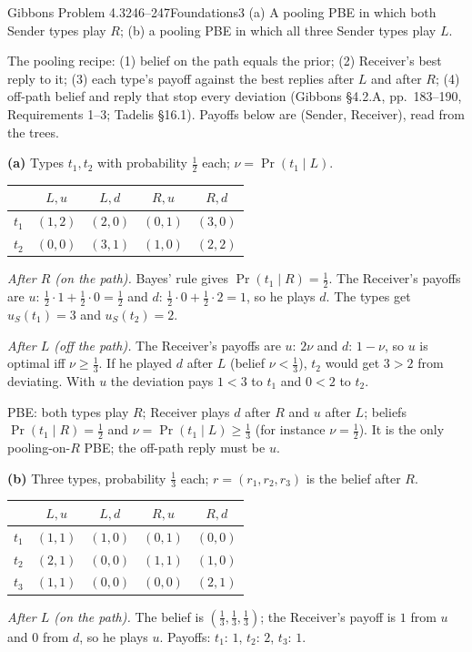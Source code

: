\begin{exsol}{Gibbons Problem 4.3}{246--247}{Foundations}{3}
\asked (a) A pooling PBE in which both Sender types play $R$; (b) a pooling PBE in which all three
Sender types play $L$.

\method The pooling recipe: (1) belief on the path equals the prior; (2) Receiver's best reply to
it; (3) each type's payoff against the best replies after $L$ and after $R$; (4) off-path belief
and reply that stop every deviation (Gibbons \S4.2.A, pp.~183--190, Requirements 1--3; Tadelis
\S16.1). Payoffs below are (Sender, Receiver), read from the trees.

\solution \textbf{(a)} Types $t_1, t_2$ with probability $\frac12$ each; $\nu = \Pr(t_1 \mid L)$.
\begin{center}
\begin{tabular}{lcccc}
\toprule
 & $L,u$ & $L,d$ & $R,u$ & $R,d$ \\
\midrule
$t_1$ & $(1,2)$ & $(2,0)$ & $(0,1)$ & $(3,0)$ \\
$t_2$ & $(0,0)$ & $(3,1)$ & $(1,0)$ & $(2,2)$ \\
\bottomrule
\end{tabular}
\end{center}
\emph{After $R$ (on the path).} Bayes' rule gives $\Pr(t_1 \mid R) = \frac12$. The Receiver's payoffs
are $u$: $\frac12 \cdot 1 + \frac12 \cdot 0 = \frac12$ and $d$: $\frac12 \cdot 0 + \frac12 \cdot 2 = 1$,
so he plays $d$. The types get $u_S(t_1) = 3$ and $u_S(t_2) = 2$.

\emph{After $L$ (off the path).} The Receiver's payoffs are $u$: $2\nu$ and $d$: $1 - \nu$, so
$u$ is optimal iff $\nu \ge \frac13$. If he played $d$ after $L$ (belief $\nu < \frac13$), $t_2$ would
get $3 > 2$ from deviating. With $u$ the deviation pays $1 < 3$ to $t_1$ and $0 < 2$ to $t_2$.

PBE: both types play $R$; Receiver plays $d$ after $R$ and $u$ after $L$; beliefs
$\Pr(t_1 \mid R) = \frac12$ and $\nu = \Pr(t_1 \mid L) \ge \frac13$ (for instance $\nu = \frac12$).
It is the only pooling-on-$R$ PBE; the off-path reply must be $u$.

\textbf{(b)} Three types, probability $\frac13$ each; $r = (r_1, r_2, r_3)$ is the belief after $R$.
\begin{center}
\begin{tabular}{lcccc}
\toprule
 & $L,u$ & $L,d$ & $R,u$ & $R,d$ \\
\midrule
$t_1$ & $(1,1)$ & $(1,0)$ & $(0,1)$ & $(0,0)$ \\
$t_2$ & $(2,1)$ & $(0,0)$ & $(1,1)$ & $(1,0)$ \\
$t_3$ & $(1,1)$ & $(0,0)$ & $(0,0)$ & $(2,1)$ \\
\bottomrule
\end{tabular}
\end{center}
\emph{After $L$ (on the path).} The belief is $(\frac13, \frac13, \frac13)$; the Receiver's payoff is
$1$ from $u$ and $0$ from $d$, so he plays $u$. Payoffs: $t_1$: $1$, $t_2$: $2$, $t_3$: $1$.


\end{exsol}
